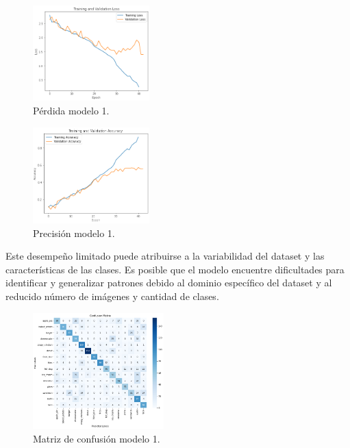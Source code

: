 \documentclass[twocolumn]{article}
\begin{document}
\begin{figure}[!ht]
\centering
\includegraphics[width=0.4\textwidth]{assets/trainmodel1loss.png}
\caption{Pérdida modelo 1.}
\label{fig:train1loss}
\end{figure}

\begin{figure}[!ht]
\centering
\includegraphics[width=0.4\textwidth]{assets/trainmodel1acc.png}
\caption{Precisión modelo 1.}
\label{fig:train1acc}
\end{figure}

Este desempeño limitado puede atribuirse a la variabilidad del dataset y las características de las clases. Es posible que el modelo encuentre dificultades para identificar y generalizar patrones debido al dominio específico del dataset y al reducido número de imágenes y cantidad de clases.

\begin{figure}[!ht]
\centering
\includegraphics[width=0.45\textwidth]{assets/confmodel1.png}
\caption{Matriz de confusión modelo 1.}
\label{fig:conf1}
\end{figure}
\end{document}
